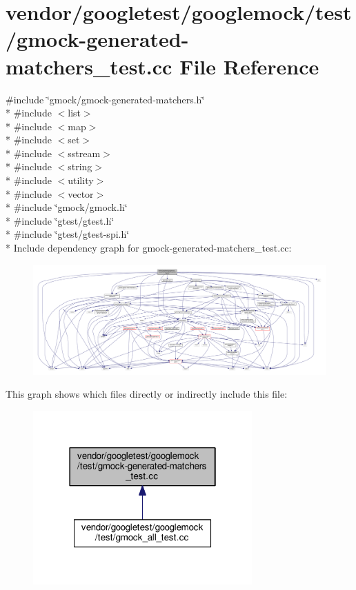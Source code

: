 \hypertarget{gmock-generated-matchers__test_8cc}{}\section{vendor/googletest/googlemock/test/gmock-\/generated-\/matchers\+\_\+test.cc File Reference}
\label{gmock-generated-matchers__test_8cc}
{\ttfamily \#include \char`\"{}gmock/gmock-\/generated-\/matchers.\+h\char`\"{}}\\*
{\ttfamily \#include $<$list$>$}\\*
{\ttfamily \#include $<$map$>$}\\*
{\ttfamily \#include $<$set$>$}\\*
{\ttfamily \#include $<$sstream$>$}\\*
{\ttfamily \#include $<$string$>$}\\*
{\ttfamily \#include $<$utility$>$}\\*
{\ttfamily \#include $<$vector$>$}\\*
{\ttfamily \#include \char`\"{}gmock/gmock.\+h\char`\"{}}\\*
{\ttfamily \#include \char`\"{}gtest/gtest.\+h\char`\"{}}\\*
{\ttfamily \#include \char`\"{}gtest/gtest-\/spi.\+h\char`\"{}}\\*
Include dependency graph for gmock-\/generated-\/matchers\+\_\+test.cc\+:\nopagebreak
\begin{figure}[H]
\begin{center}
\leavevmode
\includegraphics[width=350pt]{gmock-generated-matchers__test_8cc__incl}
\end{center}
\end{figure}
This graph shows which files directly or indirectly include this file\+:\nopagebreak
\begin{figure}[H]
\begin{center}
\leavevmode
\includegraphics[width=238pt]{gmock-generated-matchers__test_8cc__dep__incl}
\end{center}
\end{figure}

